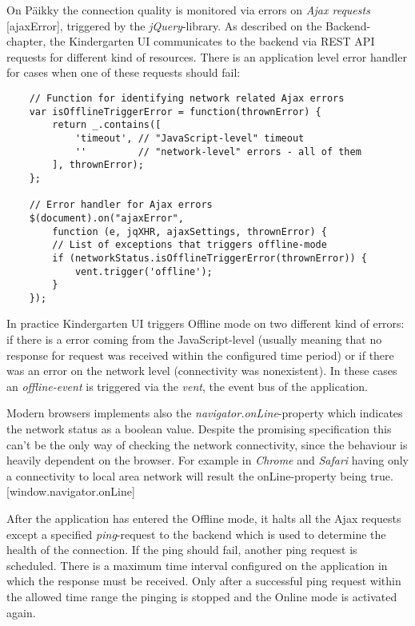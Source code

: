 On Päikky the connection quality is monitored via errors on \textit{Ajax requests} [ajaxError], triggered by the \textit{jQuery}-library. As described on the Backend-chapter, the Kindergarten UI communicates to the backend via REST API requests for different kind of resources. There is an application level error handler for cases when one of these requests should fail:
\begin{lstlisting}
    // Function for identifying network related Ajax errors
    var isOfflineTriggerError = function(thrownError) {
        return _.contains([
            'timeout', // "JavaScript-level" timeout
            ''         // "network-level" errors - all of them
        ], thrownError);
    };

    // Error handler for Ajax errors
    $(document).on("ajaxError",
        function (e, jqXHR, ajaxSettings, thrownError) {
        // List of exceptions that triggers offline-mode
        if (networkStatus.isOfflineTriggerError(thrownError)) {
            vent.trigger('offline');
        }
    });
\end{lstlisting}
\noindent
In practice Kindergarten UI triggers Offline mode on two different kind of errors: if there is a error coming from the JavaScript-level (usually meaning that no response for request was received within the configured time period) or if there was an error on the network level (connectivity was nonexistent). In these cases an \textit{offline-event} is triggered via the \textit{vent}, the event bus of the application.

Modern browsers implements also the \textit{navigator.onLine}-property which indicates the network status as a boolean value. Despite the promising specification this can't be the only way of checking the network connectivity, since the behaviour is heavily dependent on the browser. For example in \textit{Chrome} and \textit{Safari} having only a connectivity to local area network will result the onLine-property being true. [window.navigator.onLine]

After the application has entered the Offline mode, it halts all the Ajax requests except a specified \textit{ping}-request to the backend which is used to determine the health of the connection. If the ping should fail, another ping request is scheduled. There is a maximum time interval configured on the application in which the response must be received. Only after a successful ping request within the allowed time range the pinging is stopped and the Online mode is activated again.

